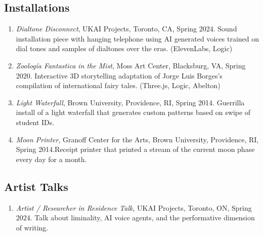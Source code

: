  
   \subsection{Installations}
  \begin{enumerate}
    \item  \emph{Dialtone Disconnect}, UKAI Projects, Toronto, CA, Spring 2024. \subitem Sound installation piece with hanging telephone using AI generated voices trained on dial tones and samples of dialtones over the eras. (ElevenLabs, Logic)\\
  \item  \emph{Zoolog\'ia Fantastica in the Mist}, Moss Art Center, Blacksburg, VA, Spring 2020. \subitem Interactive 3D storytelling adaptation of Jorge Luis Borges's compilation of international fairy tales. (Three.js, Logic, Abelton)\\
  \item  \emph{Light Waterfall}, Brown University, Providence, RI, Spring 2014. \subitem Guerrilla install of a light waterfall that generates custom patterns based on swipe of student IDs. \\
\item  \emph{Moon Printer}, Granoff Center for the Arts, Brown University, Providence, RI, Spring 2014.\subitem  Receipt printer that printed a stream of the current moon phase every day for a month. \\
 \end{enumerate}
 
    \subsection{Artist Talks}
    \begin{enumerate}
    \item \emph{Artist / Researcher in Residence Talk}, UKAI Projects, Toronto, ON, Spring 2024. \subitem Talk about liminality, AI voice agents, and the performative dimension of writing. 
    \end{enumerate}
 
